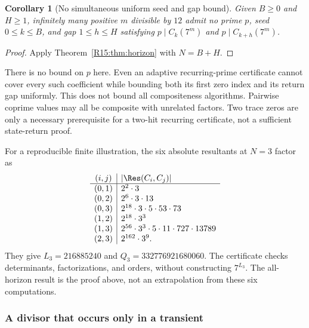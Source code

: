 \documentclass[11pt,a4paper]{article}
\newtheorem{corollary}[theorem]{Corollary}\newtheorem{mainthm}[theorem]{Theorem}
\theoremstyle{definition}\newtheorem{definition}[theorem]{Definition}
\theoremstyle{remark}\newtheorem{remark}[theorem]{Remark}
\begin{document}
\begin{corollary}[No simultaneous uniform seed and gap bound]
\label{R15:cor:bounded}
Given $B\ge0$ and $H\ge1$, infinitely many positive $m$ divisible
by $12$ admit no prime $p$, seed $0\le k\le B$, and gap
$1\le h\le H$ satisfying
$p\mid C_k(7^m)$ and $p\mid C_{k+h}(7^m)$.
\end{corollary}
\begin{proof}
Apply Theorem~\ref{R15:thm:horizon} with $N=B+H$.
\end{proof}
There is no bound on $p$ here. Even an adaptive recurring-prime
certificate cannot cover every such coefficient while bounding both
its first zero index and its return gap uniformly. This does not
bound all compositeness algorithms. Pairwise coprime values may all
be composite with unrelated factors. Two trace zeros are only a
necessary prerequisite for a two-hit recurring certificate, not a
sufficient state-return proof.

For a reproducible finite illustration, the six absolute resultants
at $N=3$ factor as
\[
\begin{array}{c|l}
(i,j)&|\Res(C_i,C_j)|\\\hline
(0,1)&2^2\cdot3\\
(0,2)&2^6\cdot3\cdot13\\
(0,3)&2^{18}\cdot3\cdot5\cdot53\cdot73\\
(1,2)&2^{18}\cdot3^3\\
(1,3)&2^{56}\cdot3^3\cdot5\cdot11\cdot727\cdot13789\\
(2,3)&2^{162}\cdot3^9.
\end{array}
\]
They give $L_3=216885240$ and $Q_3=332776921680060$.
The certificate checks determinants, factorizations, and orders, without
constructing $7^{L_3}$. The all-horizon result is the proof above,
not an extrapolation from these six computations.

\subsubsection{A divisor that occurs only in a transient}
\end{document}
